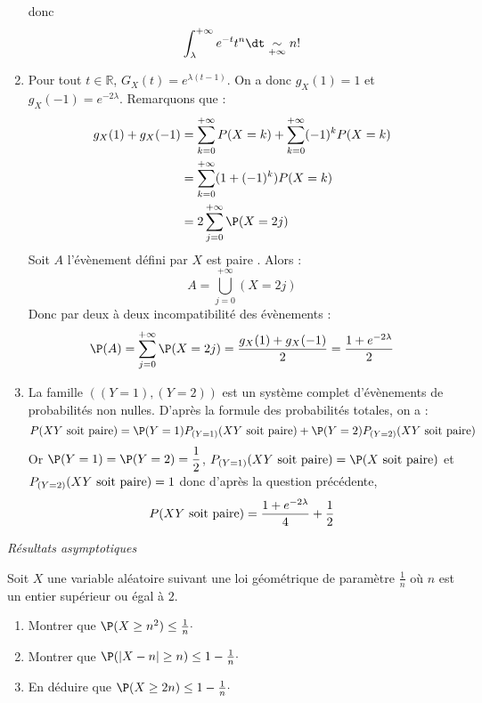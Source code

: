 \documentclass[a4paper,10pt]{report}
\begin{document}
\begin{enumerate}
donc 
$$  \int_{\lambda}^{+ \infty} e^{-t} t^n \dt \underset{+ \infty}{\sim} n! $$
\item Pour tout $t \in \mathbb{R}$, $G_X(t) = e^{\lambda (t-1)}$. On a donc $g_X(1)=1$ et $g_X(-1)=e^{-2 \lambda}$. Remarquons que :
\begin{align*}
g_X(1) + g_X(-1) & = \sum_{k=0}^{+ \infty} P(X=k)  + \sum_{k=0}^{+ \infty} (-1)^k P(X=k)  \\
& = \sum_{k=0}^{+ \infty} (1+(-1)^k) P(X=k)  \\
& = 2 \sum_{j=0}^{+ \infty} \P(X=2j)
\end{align*}
Soit $A$ l'évènement défini par \og $X$ est paire \fg. Alors :
$$ A = \bigcup_{j=0}^{+ \infty} (X=2j)$$
Donc par deux à deux incompatibilité des évènements :
$$ \P(A) = \sum_{j=0}^{+ \infty} \P(X=2j) = \dfrac{g_X(1) +g_X(-1)}{2} = \dfrac{1+e^{-2\lambda}}{2}$$
\item La famille $((Y=1), (Y=2))$ est un système complet d'évènements de probabilités non nulles. D'après la formule des probabilités totales, on a :
$$ P(XY \hbox{ soit paire}) = \P(Y=1)P_{(Y=1)}(XY \hbox{ soit paire}) + \P(Y=2)P_{(Y=2)}(XY \hbox{ soit paire})$$
Or $\P(Y=1)= \P(Y=2) = \dfrac{1}{2}$, $P_{(Y=1)}(XY \hbox{ soit paire}) = \P(X \hbox{ soit paire})$ et $P_{(Y=2)}(XY \hbox{ soit paire}) = 1$ donc d'après la question précédente,
$$ P(XY \hbox{ soit paire}) = \dfrac{1+e^{-2\lambda}}{4} + \dfrac{1}{2}$$

\end{enumerate}

\medskip

\begin{center}
\textit{{ {\large Résultats asymptotiques}}}
\end{center}

\medskip

\begin{Exercice}{} Soit $X$ une variable aléatoire suivant une loi géométrique de paramètre $\tfrac{1}{n}$ où $n$ est un entier supérieur ou égal à $2$.

\begin{enumerate}
\item Montrer que $\P(X \geq n^2) \leq \tfrac{1}{n}\cdot$
\item Montrer que $\P(\vert X-n \vert  \geq n ) \leq 1 - \tfrac{1}{n} \cdot$
\item En déduire que $\P(X \geq 2n) \leq 1 - \tfrac{1}{n} \cdot$
\end{enumerate}
\end{Exercice}
\end{document}
